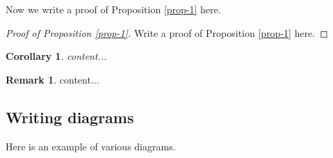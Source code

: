 \documentclass[11pt,leqno]{amsart}
\numberwithin{equation}{subsection}
\newtheorem{corollary}[equation]{Corollary}
\theoremstyle{definition}
\newtheorem{remark}[equation]{Remark}
\begin{document}
Now we write a proof of Proposition \ref{prop-1} here. 
\begin{proof}[Proof of Proposition \ref{prop-1}]
	Write a proof of Proposition \ref{prop-1} here. 
\end{proof}

\begin{corollary}
	content...
\end{corollary}

\begin{remark}
	content...
\end{remark}


\subsection{Writing diagrams}
Here is an example of various diagrams. 
\end{document}
